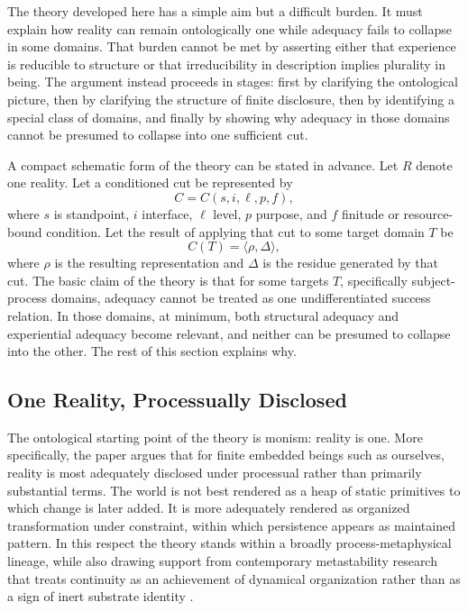 \documentclass[11pt]{article}
\begin{document}
The theory developed here has a simple aim but a difficult burden. It must explain how reality can remain ontologically one while adequacy fails to collapse in some domains. That burden cannot be met by asserting either that experience is reducible to structure or that irreducibility in description implies plurality in being. The argument instead proceeds in stages: first by clarifying the ontological picture, then by clarifying the structure of finite disclosure, then by identifying a special class of domains, and finally by showing why adequacy in those domains cannot be presumed to collapse into one sufficient cut.

A compact schematic form of the theory can be stated in advance. Let \(R\) denote one reality. Let a conditioned cut be represented by
\[
C = C(s,i,\ell,p,f),
\]
where \(s\) is standpoint, \(i\) interface, \(\ell\) level, \(p\) purpose, and \(f\) finitude or resource-bound condition. Let the result of applying that cut to some target domain \(T\) be
\[
C(T) = \langle \rho,\Delta \rangle,
\]
where \(\rho\) is the resulting representation and \(\Delta\) is the residue generated by that cut. The basic claim of the theory is that for some targets \(T\), specifically subject-process domains, adequacy cannot be treated as one undifferentiated success relation. In those domains, at minimum, both structural adequacy and experiential adequacy become relevant, and neither can be presumed to collapse into the other. The rest of this section explains why.

\subsection{One Reality, Processually Disclosed}

The ontological starting point of the theory is monism: reality is one. More specifically, the paper argues that for finite embedded beings such as ourselves, reality is most adequately disclosed under processual rather than primarily substantial terms. The world is not best rendered as a heap of static primitives to which change is later added. It is more adequately rendered as organized transformation under constraint, within which persistence appears as maintained pattern. In this respect the theory stands within a broadly process-metaphysical lineage, while also drawing support from contemporary metastability research that treats continuity as an achievement of dynamical organization rather than as a sign of inert substrate identity \cite{Whitehead1978,Rescher1996,TognoliKelso2014}.
\end{document}
